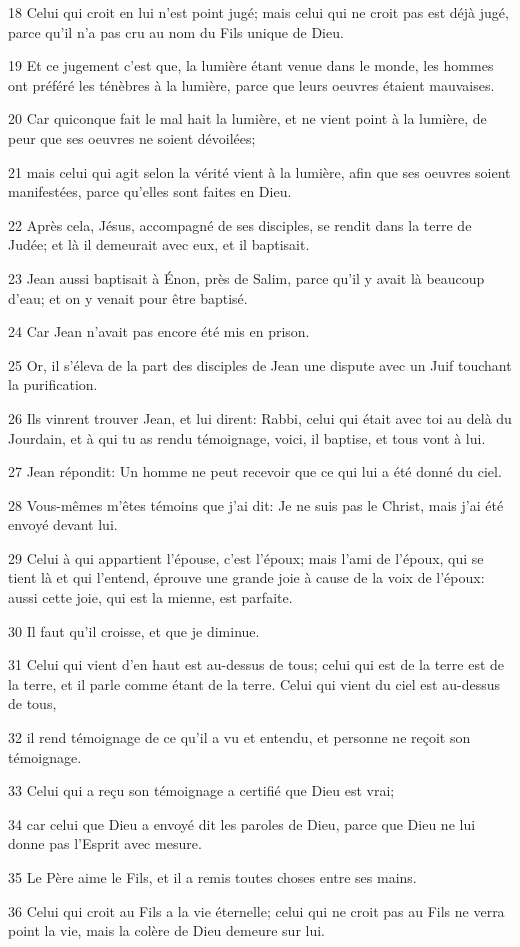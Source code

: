 \par 18 Celui qui croit en lui n'est point jugé; mais celui qui ne croit pas est déjà jugé, parce qu'il n'a pas cru au nom du Fils unique de Dieu.
\par 19 Et ce jugement c'est que, la lumière étant venue dans le monde, les hommes ont préféré les ténèbres à la lumière, parce que leurs oeuvres étaient mauvaises.
\par 20 Car quiconque fait le mal hait la lumière, et ne vient point à la lumière, de peur que ses oeuvres ne soient dévoilées;
\par 21 mais celui qui agit selon la vérité vient à la lumière, afin que ses oeuvres soient manifestées, parce qu'elles sont faites en Dieu.
\par 22 Après cela, Jésus, accompagné de ses disciples, se rendit dans la terre de Judée; et là il demeurait avec eux, et il baptisait.
\par 23 Jean aussi baptisait à Énon, près de Salim, parce qu'il y avait là beaucoup d'eau; et on y venait pour être baptisé.
\par 24 Car Jean n'avait pas encore été mis en prison.
\par 25 Or, il s'éleva de la part des disciples de Jean une dispute avec un Juif touchant la purification.
\par 26 Ils vinrent trouver Jean, et lui dirent: Rabbi, celui qui était avec toi au delà du Jourdain, et à qui tu as rendu témoignage, voici, il baptise, et tous vont à lui.
\par 27 Jean répondit: Un homme ne peut recevoir que ce qui lui a été donné du ciel.
\par 28 Vous-mêmes m'êtes témoins que j'ai dit: Je ne suis pas le Christ, mais j'ai été envoyé devant lui.
\par 29 Celui à qui appartient l'épouse, c'est l'époux; mais l'ami de l'époux, qui se tient là et qui l'entend, éprouve une grande joie à cause de la voix de l'époux: aussi cette joie, qui est la mienne, est parfaite.
\par 30 Il faut qu'il croisse, et que je diminue.
\par 31 Celui qui vient d'en haut est au-dessus de tous; celui qui est de la terre est de la terre, et il parle comme étant de la terre. Celui qui vient du ciel est au-dessus de tous,
\par 32 il rend témoignage de ce qu'il a vu et entendu, et personne ne reçoit son témoignage.
\par 33 Celui qui a reçu son témoignage a certifié que Dieu est vrai;
\par 34 car celui que Dieu a envoyé dit les paroles de Dieu, parce que Dieu ne lui donne pas l'Esprit avec mesure.
\par 35 Le Père aime le Fils, et il a remis toutes choses entre ses mains.
\par 36 Celui qui croit au Fils a la vie éternelle; celui qui ne croit pas au Fils ne verra point la vie, mais la colère de Dieu demeure sur lui.

